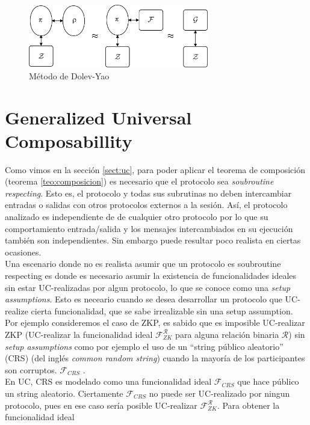 \begin{figure}[hp]
    \centering
    \includegraphics[width=0.7\textwidth]{figs/dolev_yao}
    \caption{Método de Dolev-Yao}
    \label{fig:dolev-yao}
\end{figure}

\section{Generalized Universal Composabillity}
Como vimos en la sección \ref{sect:uc}, para poder aplicar el teorema de composición (teorema
\ref{teo:composicion}) es necesario que el protocolo sea \textit{soubroutine respecting}.
Esto es, el protocolo y todas sus subrutinas no deben intercambiar entradas o salidas con otros
protocolos externos a la sesión. Así, el protocolo analizado es independiente de de cualquier
otro protocolo por lo que su comportamiento entrada/salida y los mensajes intercambiados en su
ejecución también son independientes. Sin embargo puede resultar poco realista en ciertas ocasiones.\\
Una escenario donde no es realista asumir que un protocolo es soubroutine respecting es donde
es necesario asumir la existencia de funcionalidades ideales sin estar UC-realizadas por algun
protocolo, lo que se conoce como una \textit{setup assumptions}. Esto es neceario cuando se desea
desarrollar un protocolo que UC-realize cierta funcionalidad, que se sabe irrealizable sin una setup
assumption. Por ejemplo consideremos el caso de ZKP, es sabido que es imposible UC-realizar
ZKP (UC-realizar la funcionalidad ideal $\mathcal{F}_{ZK}^\mathcal{R}$ para alguna relación binaria
$\mathcal{R}$) sin \textit{setup assumptions} como por ejemplo el uso de un ``string público
aleatorio'' (CRS) (del inglés \textit{common random string}) cuando la mayoría de los participantes
son corruptos. $\mathcal{F}_{CRS}$ \cite{CanKusLin06}.\\
En UC, CRS es modelado como una funcionalidad ideal $\mathcal{F}_{CRS}$ que hace público un string
aleatorio. Ciertamente $\mathcal{F}_{CRS}$ no puede ser UC-realizado por ningun protocolo, pues
en ese caso sería posible UC-realizar $\mathcal{F}_{ZK}^\mathcal{R}$. Para obtener la funcionalidad ideal
